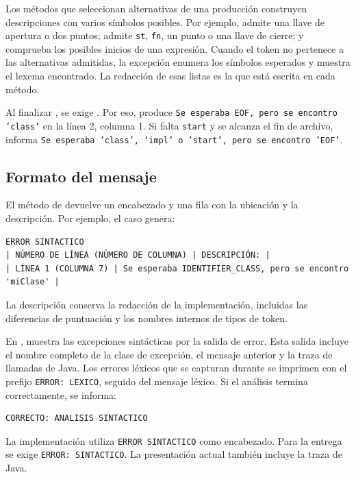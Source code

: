 Los métodos que seleccionan alternativas de una producción construyen
descripciones con varios símbolos posibles. Por ejemplo,
 admite una llave de apertura o dos puntos;
 admite \texttt{st}, \texttt{fn}, un punto o una llave
de cierre; y  comprueba los posibles inicios de una
expresión. Cuando el token no pertenece a las alternativas admitidas,
la excepción enumera los símbolos esperados y muestra el lexema encontrado.
La redacción de esas listas es la que está escrita en cada método.

Al finalizar , se exige . Por eso,
 produce
\texttt{Se esperaba EOF, pero se encontro 'class'} en la línea 2,
columna 1. Si falta \texttt{start} y se alcanza el fin de archivo,
 informa
\texttt{Se esperaba 'class', 'impl' o 'start', pero se encontro 'EOF'}.

\subsection{Formato del mensaje}
El método  de  devuelve
un encabezado y una fila con la ubicación y la descripción. Por ejemplo,
el caso  genera:
\begin{lstlisting}[style=bnftinys]
ERROR SINTACTICO
| NÚMERO DE LÍNEA (NÚMERO DE COLUMNA) | DESCRIPCIÓN: |
| LÍNEA 1 (COLUMNA 7) | Se esperaba IDENTIFIER_CLASS, pero se encontro 'miClase' |
\end{lstlisting}
La descripción conserva la redacción de la implementación, incluidas
las diferencias de puntuación y los nombres internos de tipos de token.

En ,  muestra las excepciones
sintácticas por la salida de error. Esta salida incluye el nombre
completo de la clase de excepción, el mensaje anterior y la traza de
llamadas de Java. Los errores léxicos que se capturan durante
 se imprimen con el prefijo
\texttt{ERROR: LEXICO}, seguido del mensaje léxico. Si el análisis
termina correctamente, se informa:
\begin{verbatim}
CORRECTO: ANALISIS SINTACTICO
\end{verbatim}
La implementación utiliza \texttt{ERROR SINTACTICO} como encabezado.
Para la entrega se exige \texttt{ERROR: SINTACTICO}.
La presentación actual también incluye la traza de Java.

